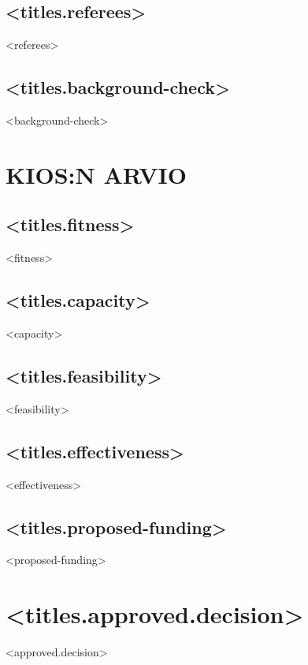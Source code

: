 \documentclass[twoside,a4paper]{article}
\begin{document}
		\subsection*{<titles.referees>}
		    <referees>
		
		\subsection*{<titles.background-check>}
		    <background-check>
		
		\newpage	
		\section{KIOS:N ARVIO}
		\subsection*{<titles.fitness>}
		    <fitness>
		
		\subsection*{<titles.capacity>}
		    <capacity>
		
		\subsection*{<titles.feasibility>}		
		    <feasibility>
		
		\subsection*{<titles.effectiveness>}	
		    <effectiveness>
		
		\subsection*{<titles.proposed-funding>}
		    <proposed-funding>
		
		\newpage
	\section{<titles.approved.decision>}		
		<approved.decision>
	
\end{document}
